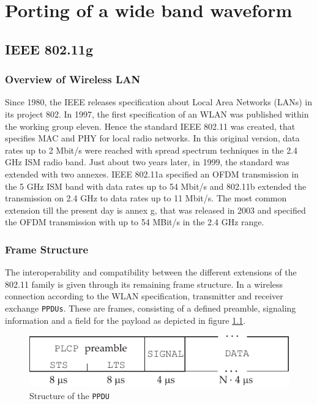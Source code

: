 \chapter{Porting of a wide band waveform}

\section{IEEE 802.11g}

\subsection{Overview of Wireless LAN}
Since 1980, the \ac{IEEE} releases specification about Local Area Networks (LANs) in its project 802. In 1997, the first specification of an \ac{WLAN} was published within the working group eleven. Hence the standard IEEE 802.11 was created, that specifies \ac{MAC} and \ac{PHY} for local radio networks. In this original version, data rates up to 2 Mbit/s were reached with spread spectrum techniques in the 2.4 GHz \ac{ISM} radio band. Just about two years later, in 1999, the standard was extended with two annexes. IEEE 802.11a specified an \ac{OFDM} transmission in the 5 GHz \ac{ISM} band with data rates up to 54 Mbit/s and 802.11b extended the transmission on 2.4 GHz to data rates up to 11 Mbit/s. The most common extension till the present day is annex g, that was released in 2003 and specified the \ac{OFDM} transmission with up to 54 MBit/s in the 2.4 GHz range.

\subsection{Frame Structure}
The interoperability and compatibility between the different extensions of the 802.11 family is given through its remaining frame structure. In a wireless connection according to the \ac{WLAN} specification, transmitter and receiver exchange \texttt{\acp{PPDU}}. These are frames, consisting of a defined preamble, signaling information and a field for the payload as depicted in figure \ref{fig:ppdu}. 

\begin{figure}[ht]
	\centering
		\includegraphics{../kapitel04/figures/ppdu.pdf}
	\caption{Structure of the \texttt{PPDU}}
	\label{fig:ppdu}
\end{figure}


